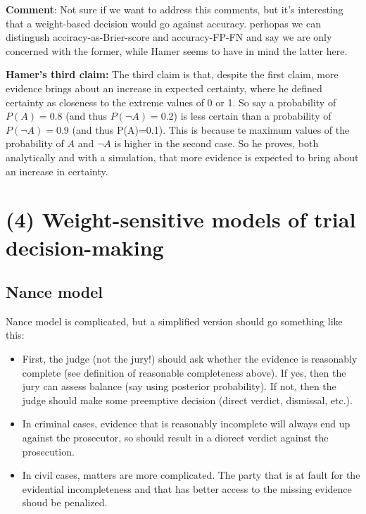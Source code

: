 \documentclass[
  10pt,
  dvipsnames,enabledeprecatedfontcommands]{scrartcl}
\begin{document}
\textbf{Comment}: Not sure if we want to address this comments, but it's
interesting that a weight-based decision would go against accuracy.
perhopas we can distingush acciracy-as-Brier-score and accuracy-FP-FN
and say we are only concerned with the former, while Hamer seems to have
in mind the latter here.

\textbf{Hamer's third claim:} The third claim is that, despite the first
claim, more evidence brings about an increase in expected certainty,
where he defined certainty as closeness to the extreme values of 0 or 1.
So say a probability of \(P(A)=0.8\) (and thus \(P(\neg A)=0.2\)) is
less certain than a probability of \(P(\neg A)=0.9\) (and thus
P(A)=0.1). This is because te maximum values of the probability of \(A\)
and \(\neg A\) is higher in the second case. So he proves, both
analytically and with a simulation, that more evidence is expected to
bring about an increase in certainty.

\hypertarget{weight-sensitive-models-of-trial-decision-making}{%
\section{(4) Weight-sensitive models of trial
decision-making}\label{weight-sensitive-models-of-trial-decision-making}}

\hypertarget{nance-model}{%
\subsection{Nance model}\label{nance-model}}

Nance model is complicated, but a simplified version should go something
like this:

\begin{itemize}
\item
  First, the judge (not the jury!) should ask whether the evidence is
  reasonably complete (see definition of reasonable completeness above).
  If yes, then the jury can assess balance (say using posterior
  probability). If not, then the judge should make some preemptive
  decision (direct verdict, dismissal, etc.).
\item
  In criminal cases, evidence that is reasonably incomplete will always
  end up against the prosecutor, so should result in a diorect verdict
  against the prosecution.
\item
  In civil cases, matters are more complicated. The party that is at
  fault for the evidential incompleteness and that has better access to
  the missing evidence shoud be penalized.
\end{itemize}
\end{document}
